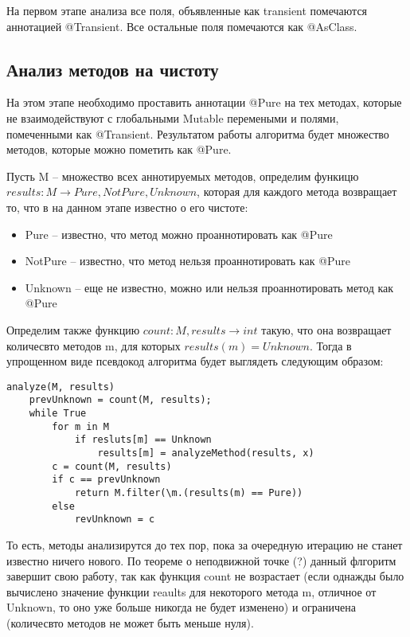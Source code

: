 На первом этапе анализа все поля, объявленные как transient помечаются аннотацией @Transient. Все остальные поля помечаются как @AsClass. 

\subsection{Анализ методов на чистоту}

На этом этапе необходимо проставить аннотации @Pure на тех методах, которые не взаимодействуют с глобальными Mutable перемеными и полями, помеченными как @Transient. Результатом работы алгоритма будет множество методов, которые можно пометить как @Pure. 

Пусть M -- множество всех аннотируемых методов, определим функицю $results: M \rightarrow {Pure, NotPure, Unknown}$, которая для каждого метода возвращает то, что в на данном этапе известно о его чистоте:
\begin{itemize}
\item Pure -- известно, что метод можно проаннотировать как @Pure
\item NotPure -- известно, что метод нельзя проаннотировать как @Pure
\item Unknown -- еще не известно, можно или нельзя проаннотировать метод как @Pure
\end{itemize}

Определим также функцию $count: M, results \rightarrow int$ такую, что она возвращает количесвто методов m, для которых $results(m) = Unknown$. Тогда в упрощенном виде псевдокод алгоритма будет выглядеть следующим образом:

\begin{lstlisting}[caption=Анализ чистоты методов, label=code:purity]
analyze(M, results)
    prevUnknown = count(M, results);
    while True 
        for m in M 
            if resluts[m] == Unknown
                results[m] = analyzeMethod(results, x)
        c = count(M, results)
        if c == prevUnknown 
        	return M.filter(\m.(results(m) == Pure))        
        else 
            revUnknown = c
\end{lstlisting}

То есть, методы анализирутся до тех пор, пока за очередную итерацию не станет известно ничего нового. По теореме о неподвижной точке (?) данный флгоритм завершит свою работу, так как функция count не возрастает (если однажды было вычислено значение функции reaults для некоторого метода m, отличное от Unknown, то оно уже больше никогда не будет изменено) и ограничена (количесвто методов не может быть меньше нуля). 

